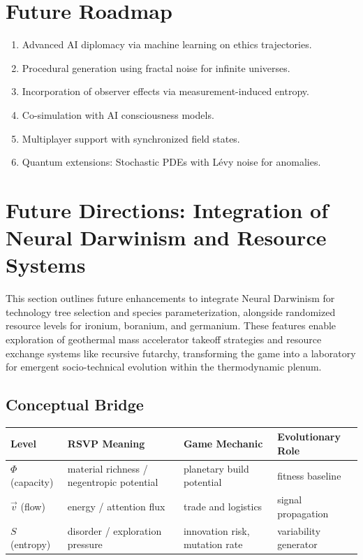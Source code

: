 \documentclass[12pt]{article}
\theoremstyle{definition}
\begin{document}
\section{Future Roadmap}
\begin{enumerate}
  \item Advanced AI diplomacy via machine learning on ethics trajectories.
  \item Procedural generation using fractal noise for infinite universes.
  \item Incorporation of observer effects via measurement-induced entropy.
  \item Co-simulation with AI consciousness models.
  \item Multiplayer support with synchronized field states.
  \item Quantum extensions: Stochastic PDEs with Lévy noise for anomalies.
\end{enumerate}

\section{Future Directions: Integration of Neural Darwinism and Resource Systems}
This section outlines future enhancements to integrate Neural Darwinism for technology tree selection and species parameterization, alongside randomized resource levels for ironium, boranium, and germanium. These features enable exploration of geothermal mass accelerator takeoff strategies and resource exchange systems like recursive futarchy, transforming the game into a laboratory for emergent socio-technical evolution within the thermodynamic plenum.

\subsection{Conceptual Bridge}
\begin{tabular}{llll}
\toprule
Level & RSVP Meaning & Game Mechanic & Evolutionary Role \\
\midrule
$\Phi$ (capacity) & material richness / negentropic potential & planetary build potential & fitness baseline \\
$\vec{v}$ (flow) & energy / attention flux & trade and logistics & signal propagation \\
$S$ (entropy) & disorder / exploration pressure & innovation risk, mutation rate & variability generator \\
\bottomrule
\end{tabular}
\end{document}

